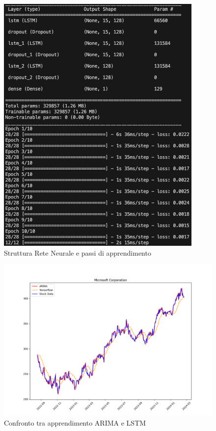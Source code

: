 \documentclass[a4paper,12pt]{article}
\begin{document}
            \begin{figure}[H]
                \centering
                \includegraphics[width=0.9\textwidth]{LSTM2.png}
                \caption{Struttura Rete Neurale e passi di apprendimento}
            \end{figure}
            \begin{figure}[H]
                \includegraphics[width=\textwidth]{GRAFICO2.png}
                \caption{Confronto tra apprendimento ARIMA e LSTM}
            \end{figure}
\end{document}
